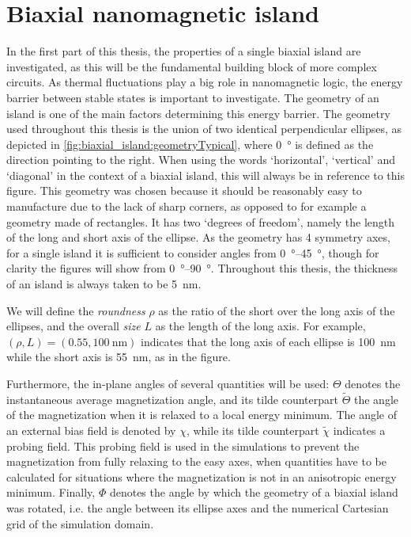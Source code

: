 \documentclass[11pt,a4paper,english,twoside]{article}
\begin{document}
\section{Biaxial nanomagnetic island}
\label{par:Biaxial_island}
In the first part of this thesis, the properties of a single biaxial island are investigated, as this will be the fundamental building block of more complex circuits. As thermal fluctuations play a big role in nanomagnetic logic, the energy barrier between stable states is important to investigate. The geometry of an island is one of the main factors determining this energy barrier. The geometry used throughout this thesis is the union of two identical perpendicular ellipses, as depicted in \cref{fig:biaxial_island:geometryTypical}, where \SI{0}{\degree} is defined as the direction pointing to the right. When using the words `horizontal', `vertical' and `diagonal' in the context of a biaxial island, this will always be in reference to this figure. This geometry was chosen because it should be reasonably easy to manufacture due to the lack of sharp corners, as opposed to for example a geometry made of rectangles. It has two `degrees of freedom', namely the length of the long and short axis of the ellipse. As the geometry has 4 symmetry axes, for a single island it is sufficient to consider angles from \SIrange{0}{45}{\degree}, though for clarity the figures will show from \SIrange{0}{90}{\degree}. Throughout this thesis, the thickness of an island is always taken to be \SI{5}{\nano\metre}. \par
We will define the \textit{roundness} $\rho$ as the ratio of the short over the long axis of the ellipses, and the overall \textit{size} $L$ as the length of the long axis. For example, $(\rho, L)=(0.55, \SI{100}{\nano\metre})$ indicates that the long axis of each ellipse is \SI{100}{\nano\metre} while the short axis is \SI{55}{\nano\metre}, as in the figure. \par
Furthermore, the in-plane angles of several quantities will be used: $\Theta$ denotes the instantaneous average magnetization angle, and its tilde counterpart $\widetilde{\Theta}$ the angle of the magnetization when it is relaxed to a local energy minimum. The angle of an external bias field is denoted by $\chi$, while its tilde counterpart $\widetilde{\chi}$ indicates a probing field. This probing field is used in the simulations to prevent the magnetization from fully relaxing to the easy axes, when quantities have to be calculated for situations where the magnetization is not in an anisotropic energy minimum. Finally, $\Phi$ denotes the angle by which the geometry of a biaxial island was rotated, i.e. the angle between its ellipse axes and the numerical Cartesian grid of the simulation domain.
\end{document}
